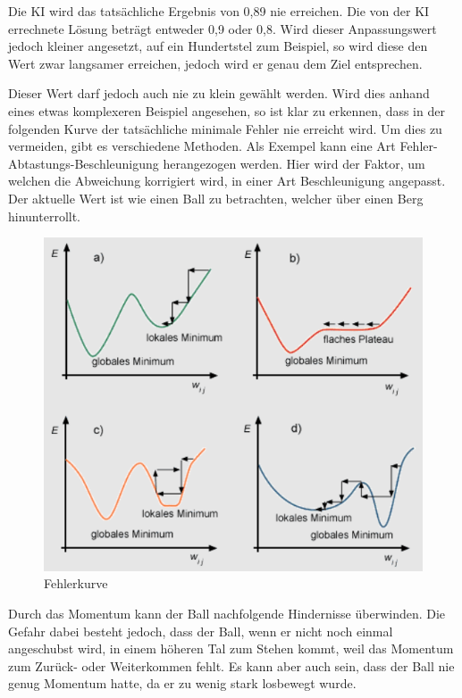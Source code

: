 Die KI wird das tatsächliche Ergebnis von 0,89 nie erreichen. Die von der KI errechnete Lösung beträgt entweder 0,9 oder 0,8. Wird dieser Anpassungswert jedoch kleiner angesetzt, auf ein Hundertstel zum Beispiel, so wird diese den Wert zwar langsamer erreichen, jedoch wird er genau dem Ziel entsprechen.

Dieser Wert darf jedoch auch nie zu klein gewählt werden. Wird dies anhand eines etwas komplexeren Beispiel angesehen, so ist klar zu erkennen, dass in der folgenden Kurve der tatsächliche minimale Fehler nie erreicht wird. Um dies zu vermeiden, gibt es verschiedene Methoden. Als Exempel kann eine Art Fehler-Abtastungs-Beschleunigung herangezogen werden. Hier wird der Faktor, um welchen die Abweichung korrigiert wird, in einer Art Beschleunigung angepasst. Der aktuelle Wert ist wie einen Ball zu betrachten, welcher über einen Berg hinunterrollt.

\begin{figure}[H]
  \centering
  \includegraphics[scale=1]{pics/ai/fehlerkurve.png}
  \caption{Fehlerkurve \cite{tech:fehlerkurve:cite}}
  \label{fig:tech:Fehler}
\end{figure}

Durch das Momentum kann der Ball nachfolgende Hindernisse überwinden. Die Gefahr dabei besteht jedoch, dass der Ball, wenn er nicht noch einmal angeschubst wird, in einem höheren Tal zum Stehen kommt, weil das Momentum zum Zurück- oder Weiterkommen fehlt. Es kann aber auch sein, dass der Ball nie genug Momentum hatte, da er zu wenig stark losbewegt wurde.

